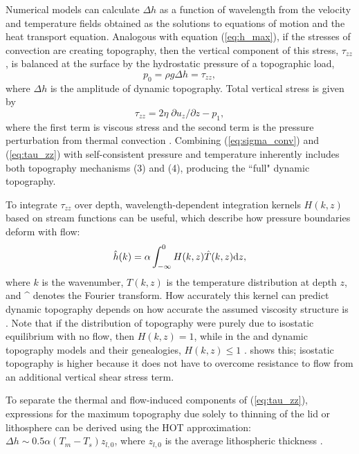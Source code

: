 Numerical models can calculate $\Delta h$ as a function of wavelength from the velocity and temperature fields obtained as the solutions to equations of motion and the heat transport equation. Analogous with equation (\ref{eq:h_max}), if the stresses of convection are creating topography, then the vertical component of this stress, $\tau_{zz}$, is balanced at the surface by the hydrostatic pressure of a topographic load, 
\begin{equation}\label{eq:sigma_conv}
p_0 = \rho g \Delta h = \tau_{zz},
\end{equation}
where $\Delta h$ is the amplitude of dynamic topography. Total vertical stress is given by 
\begin{equation}\label{eq:tau_zz}
\tau_{zz} = 2\eta \;\partial u_z / \partial z - p_1,
\end{equation}
where the first term is viscous stress and the second term is the pressure perturbation from thermal convection \citep{Parsons1983}. Combining (\ref{eq:sigma_conv}) and (\ref{eq:tau_zz}) with self-consistent pressure and temperature inherently includes both topography mechanisms (3) and (4), producing the ``full" dynamic topography. 

To integrate $\tau_{zz}$ over depth, wavelength-dependent integration kernels $H(k, z)$ based on stream functions can be useful, which describe how pressure boundaries deform with flow:
\begin{equation}\label{eq:H_kernel}
\hat{h}(k) = \alpha \int^{0}_{-\infty} H(k, z) \hat{T}(k, z) {\rm d}z,
\end{equation}
where $k$ is the wavenumber, $T(k, z)$ is the temperature distribution at depth $z$, and \string^ denotes the Fourier transform. How accurately this kernel can predict dynamic topography depends on how accurate the assumed viscosity structure is \citep{Hager1989, Karato2008a}. Note that if the distribution of topography were purely due to isostatic equilibrium with no flow, then $H(k, z) = 1$, while in the \citet{Parsons1983} and \citet{Kiefer1986} dynamic topography models and their genealogies, $H(k, z) \le 1$ \citep{Molnar2015}. \citet{McKenzie1968, McKenzie1977} shows this; isostatic topography is higher because it does not have to overcome resistance to flow from an additional vertical shear stress term. 

To separate the thermal and flow-induced components of (\ref{eq:tau_zz}), expressions for the maximum topography due solely to thinning of the lid or lithosphere can be derived using the HOT approximation: $\Delta h \sim 0.5\alpha (T_m - T_s) z_{l, 0}$, where $z_{l, 0}$ is the average lithospheric thickness \citep[e.g.,][]{Orth2011}.

